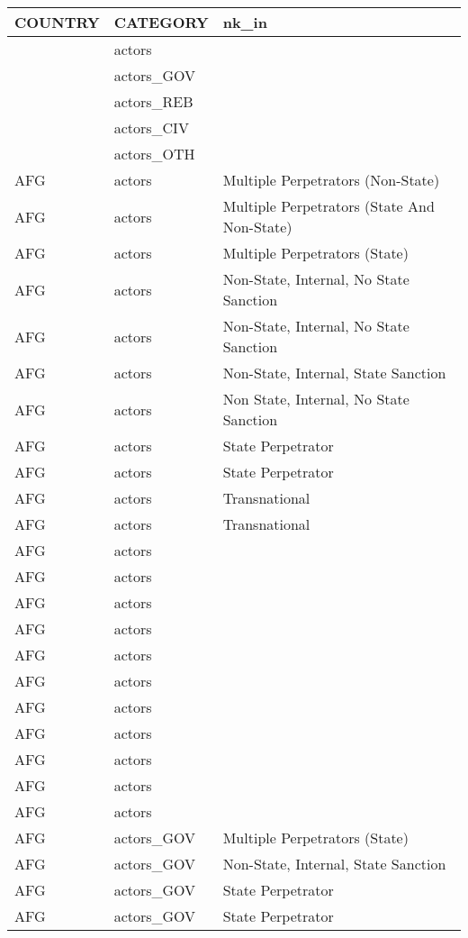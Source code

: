 \begin{table}[ht]
\centering
\begin{tabular}{lll}
  \hline
COUNTRY & CATEGORY & nk\_in \\ 
  \hline
 & actors &  \\ 
   & actors\_GOV &  \\ 
   & actors\_REB &  \\ 
   & actors\_CIV &  \\ 
   & actors\_OTH &  \\ 
  AFG & actors & Multiple Perpetrators (Non-State) \\ 
  AFG & actors & Multiple Perpetrators (State And Non-State) \\ 
  AFG & actors & Multiple Perpetrators (State) \\ 
  AFG & actors & Non-State, Internal, No State Sanction \\ 
  AFG & actors & Non-State, Internal, No State Sanction \\ 
  AFG & actors & Non-State, Internal, State Sanction \\ 
  AFG & actors & Non State, Internal, No State Sanction \\ 
  AFG & actors & State Perpetrator \\ 
  AFG & actors & State Perpetrator \\ 
  AFG & actors & Transnational \\ 
  AFG & actors & Transnational \\ 
  AFG & actors &  \\ 
  AFG & actors &  \\ 
  AFG & actors &  \\ 
  AFG & actors &  \\ 
  AFG & actors &  \\ 
  AFG & actors &  \\ 
  AFG & actors &  \\ 
  AFG & actors &  \\ 
  AFG & actors &  \\ 
  AFG & actors &  \\ 
  AFG & actors &  \\ 
  AFG & actors\_GOV & Multiple Perpetrators (State) \\ 
  AFG & actors\_GOV & Non-State, Internal, State Sanction \\ 
  AFG & actors\_GOV & State Perpetrator \\ 
  AFG & actors\_GOV & State Perpetrator \\ 

\end{tabular}
\end{table}
